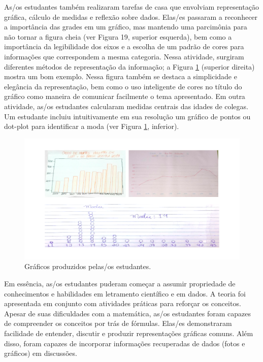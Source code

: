 \documentclass[
]{book}
\begin{document}
As/os estudantes também realizaram tarefas de casa que envolviam representação gráfica, cálculo de medidas e reflexão sobre dados. Elas/es passaram a reconhecer a importância das grades em um gráfico, mas mantendo uma parcimônia para não tornar a figura cheia (ver Figura 19, superior esquerda), bem como a importância da legibilidade dos eixos e a escolha de um padrão de cores para informações que correspondem a mesma categoria. Nessa atividade, surgiram diferentes métodos de representação da informação; a Figura \ref{fig:exercestud} (superior direita) mostra um bom exemplo. Nessa figura também se destaca a simplicidade e elegância da representação, bem como o uso inteligente de cores no título do gráfico como maneira de comunicar facilmente o tema apresentado. Em outra atividade, as/os estudantes calcularam medidas centrais das idades de colegas. Um estudante incluiu intuitivamente em sua resolução um gráfico de pontos ou dot-plot para identificar a moda (ver Figura \ref{fig:exercestud}, inferior).

\begin{figure}
\includegraphics[width=18.97in]{images/exercico_estudantes} \caption{Gráficos produzidos pelas/os estudantes.}\label{fig:exercestud}
\end{figure}

Em essência, as/os estudantes puderam começar a assumir propriedade de conhecimentos e habilidades em letramento científico e em dados. A teoria foi apresentada em conjunto com atividades práticas para reforçar os conceitos. Apesar de suas dificuldades com a matemática, as/os estudantes foram capazes de compreender os conceitos por trás de fórmulas. Elas/es demonstraram facilidade de entender, discutir e produzir representações gráficas comuns. Além disso, foram capazes de incorporar informações recuperadas de dados (fotos e gráficos) em discussões.
\end{document}
